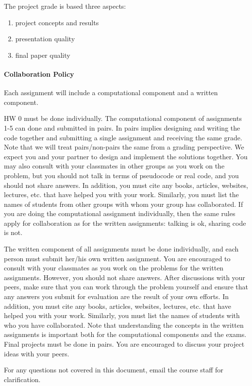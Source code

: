 \documentclass[11pt]{article}
\begin{document}
The project grade is based three aspects: 
\begin{enumerate}
\item project concepts and results 
\item presentation quality 
\item final paper quality 
\end{enumerate}

\paragraph{Collaboration Policy}

Each assignment will include a computational component and a written component.

HW 0 must be done individually. The computational component of assignments 1-5 can done and submitted in pairs. In pairs implies designing and writing the code together and submitting a single assignment and receiving the same grade. Note that we will treat pairs/non-pairs the same from a grading perspective.  We expect you and your partner to design and implement the solutions together. You may also consult with your classmates in other groups as you work on the problem, but you should not talk in terms of pseudocode or real code, and you should not share answers. In addition, you must cite any books, articles, websites, lectures, etc. that have helped you with your work. Similarly, you must list the names of students from other groups with whom your group has collaborated. If you are doing the computational assignment individually, then the same rules apply for collaboration as for the written assignments: talking is ok, sharing code is not.

The written component of all assignments must be done individually, and each person must submit her/his own written assignment. You are encouraged to consult with your classmates as you work on the problems for the written assignments. However, you should not share answers.  After discussions with your peers, make sure that you can work through the problem yourself and ensure that any answers you submit for evaluation are the result of your own efforts. In addition, you must cite any books, articles, websites, lectures, etc. that have helped you with your work. Similarly, you must list the names of students with who you have collaborated.  Note that understanding the concepts in the written assignments is important both for the computational components and the exams. Final projects must be done in pairs. You are encouraged to discuss your project ideas with your peers.

For any questions not covered in this document, email the course staff for clarification.
\end{document}
